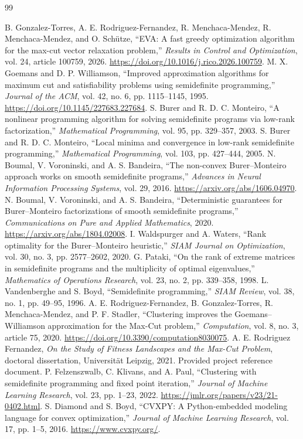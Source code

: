 \begin{thebibliography}{99}
 B. Gonzalez-Torres, A. E. Rodriguez-Fernandez, R. Menchaca-Mendez, R. Menchaca-Mendez, and O. Sch\"utze, ``EVA: A fast greedy optimization algorithm for the max-cut vector relaxation problem,'' \emph{Results in Control and Optimization}, vol. 24, article 100759, 2026. \url{https://doi.org/10.1016/j.rico.2026.100759}.
 M. X. Goemans and D. P. Williamson, ``Improved approximation algorithms for maximum cut and satisfiability problems using semidefinite programming,'' \emph{Journal of the ACM}, vol. 42, no. 6, pp. 1115--1145, 1995. \url{https://doi.org/10.1145/227683.227684}.
 S. Burer and R. D. C. Monteiro, ``A nonlinear programming algorithm for solving semidefinite programs via low-rank factorization,'' \emph{Mathematical Programming}, vol. 95, pp. 329--357, 2003.
 S. Burer and R. D. C. Monteiro, ``Local minima and convergence in low-rank semidefinite programming,'' \emph{Mathematical Programming}, vol. 103, pp. 427--444, 2005.
 N. Boumal, V. Voroninski, and A. S. Bandeira, ``The non-convex Burer--Monteiro approach works on smooth semidefinite programs,'' \emph{Advances in Neural Information Processing Systems}, vol. 29, 2016. \url{https://arxiv.org/abs/1606.04970}.
 N. Boumal, V. Voroninski, and A. S. Bandeira, ``Deterministic guarantees for Burer--Monteiro factorizations of smooth semidefinite programs,'' \emph{Communications on Pure and Applied Mathematics}, 2020. \url{https://arxiv.org/abs/1804.02008}.
 I. Waldspurger and A. Waters, ``Rank optimality for the Burer--Monteiro heuristic,'' \emph{SIAM Journal on Optimization}, vol. 30, no. 3, pp. 2577--2602, 2020.
 G. Pataki, ``On the rank of extreme matrices in semidefinite programs and the multiplicity of optimal eigenvalues,'' \emph{Mathematics of Operations Research}, vol. 23, no. 2, pp. 339--358, 1998.
 L. Vandenberghe and S. Boyd, ``Semidefinite programming,'' \emph{SIAM Review}, vol. 38, no. 1, pp. 49--95, 1996.
 A. E. Rodriguez-Fernandez, B. Gonzalez-Torres, R. Menchaca-Mendez, and P. F. Stadler, ``Clustering improves the Goemans--Williamson approximation for the Max-Cut problem,'' \emph{Computation}, vol. 8, no. 3, article 75, 2020. \url{https://doi.org/10.3390/computation8030075}.
 A. E. Rodriguez Fernandez, \emph{On the Study of Fitness Landscapes and the Max-Cut Problem}, doctoral dissertation, Universit\"at Leipzig, 2021. Provided project reference document.
 P. Felzenszwalb, C. Klivans, and A. Paul, ``Clustering with semidefinite programming and fixed point iteration,'' \emph{Journal of Machine Learning Research}, vol. 23, pp. 1--23, 2022. \url{https://jmlr.org/papers/v23/21-0402.html}.
 S. Diamond and S. Boyd, ``CVXPY: A Python-embedded modeling language for convex optimization,'' \emph{Journal of Machine Learning Research}, vol. 17, pp. 1--5, 2016. \url{https://www.cvxpy.org/}.
\end{thebibliography}
